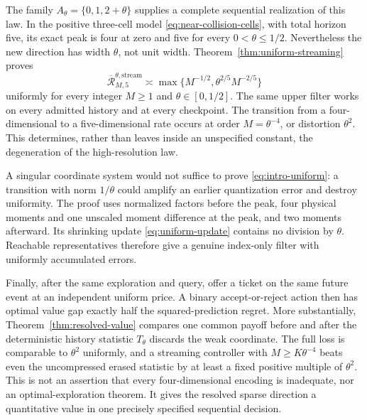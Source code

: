 The family $A_\theta=\{0,1,2+\theta\}$ supplies a complete sequential
realization of this law. In the positive three-cell model
\eqref{eq:near-collision-cells}, with total horizon five, its exact peak
is four at zero and five for every $0<\theta\le1/2$. Nevertheless the
new direction has width $\theta$, not unit width. Theorem~\ref{thm:uniform-streaming}
proves
\begin{equation}\label{eq:intro-uniform}
 \overline{\mathcal R}_{M,5}^{\theta,\mathrm{stream}}
   \asymp \max\{M^{-1/2},\theta^{2/5}M^{-2/5}\}
\end{equation}
uniformly for every integer $M\ge1$ and $\theta\in[0,1/2]$.
The same upper filter works on every admitted history and at every
checkpoint. The transition from a four-dimensional to a five-dimensional
rate occurs at order $M=\theta^{-4}$, or distortion $\theta^2$.
This determines, rather than leaves inside an unspecified constant, the
degeneration of the high-resolution law.

A singular coordinate system would not suffice to prove
\eqref{eq:intro-uniform}: a transition with norm $1/\theta$ could
amplify an earlier quantization error and destroy uniformity. The proof
uses normalized factors before the peak, four physical moments and one
unscaled moment difference at the peak, and two moments afterward. Its
shrinking update \eqref{eq:uniform-update} contains no division by
$\theta$. Reachable representatives therefore give a genuine index-only
filter with uniformly accumulated errors.

Finally, after the same exploration and query, offer a ticket on the
same future event at an independent uniform price. A binary accept-or-reject
action then has optimal value gap exactly half the squared-prediction
regret. More substantially, Theorem~\ref{thm:resolved-value} compares
one common payoff before and after the deterministic history statistic
$T_\theta$ discards the weak coordinate. The full loss is comparable
to $\theta^2$ uniformly, and a streaming controller with
$M\ge K\theta^{-4}$ beats even the uncompressed erased statistic by
at least a fixed positive multiple of $\theta^2$. This is not an
assertion that every four-dimensional encoding is inadequate, nor an
optimal-exploration theorem. It gives the resolved sparse direction a
quantitative value in one precisely specified sequential decision.


